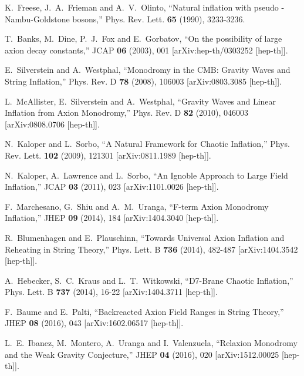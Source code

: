 \documentclass[12pt]{article}
\numberwithin{equation}{section}
\begin{document}
\begin{thebibliography}{999}
K.~Freese, J.~A.~Frieman and A.~V.~Olinto,
``Natural inflation with pseudo - Nambu-Goldstone bosons,''
Phys. Rev. Lett. \textbf{65} (1990), 3233-3236.

T.~Banks, M.~Dine, P.~J.~Fox and E.~Gorbatov,
``On the possibility of large axion decay constants,''
JCAP \textbf{06} (2003), 001
[arXiv:hep-th/0303252 [hep-th]].

E.~Silverstein and A.~Westphal,
``Monodromy in the CMB: Gravity Waves and String Inflation,''
Phys. Rev. D \textbf{78} (2008), 106003
[arXiv:0803.3085 [hep-th]].

L.~McAllister, E.~Silverstein and A.~Westphal,
``Gravity Waves and Linear Inflation from Axion Monodromy,''
Phys. Rev. D \textbf{82} (2010), 046003
[arXiv:0808.0706 [hep-th]].

N.~Kaloper and L.~Sorbo,
``A Natural Framework for Chaotic Inflation,''
Phys. Rev. Lett. \textbf{102} (2009), 121301
[arXiv:0811.1989 [hep-th]].

N.~Kaloper, A.~Lawrence and L.~Sorbo,
``An Ignoble Approach to Large Field Inflation,''
JCAP \textbf{03} (2011), 023
[arXiv:1101.0026 [hep-th]].

F.~Marchesano, G.~Shiu and A.~M.~Uranga,
``F-term Axion Monodromy Inflation,''
JHEP \textbf{09} (2014), 184
[arXiv:1404.3040 [hep-th]].

R.~Blumenhagen and E.~Plauschinn,
``Towards Universal Axion Inflation and Reheating in String Theory,''
Phys. Lett. B \textbf{736} (2014), 482-487
[arXiv:1404.3542 [hep-th]].

A.~Hebecker, S.~C.~Kraus and L.~T.~Witkowski,
``D7-Brane Chaotic Inflation,''
Phys. Lett. B \textbf{737} (2014), 16-22
[arXiv:1404.3711 [hep-th]].

F.~Baume and E.~Palti,
``Backreacted Axion Field Ranges in String Theory,''
JHEP \textbf{08} (2016), 043
[arXiv:1602.06517 [hep-th]].

L.~E.~Ibanez, M.~Montero, A.~Uranga and I.~Valenzuela,
``Relaxion Monodromy and the Weak Gravity Conjecture,''
JHEP \textbf{04} (2016), 020
[arXiv:1512.00025 [hep-th]].


\end{thebibliography}
\end{document}
